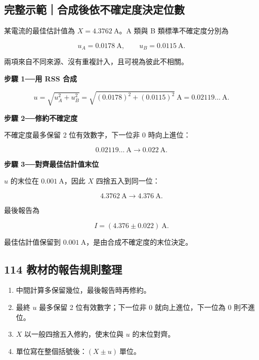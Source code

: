 \documentclass[11pt,a4paper]{article}
\providecommand{\tightlist}{%
  \setlength{\itemsep}{0pt}\setlength{\parskip}{0pt}}
\begin{document}
\begin{HandoutWorkedExample}

\subsection{完整示範｜合成後依不確定度決定位數}\label{ux5b8cux6574ux793aux7bc4ux5408ux6210ux5f8cux4f9dux4e0dux78baux5b9aux5ea6ux6c7aux5b9aux4f4dux6578}

某電流的最佳估計值為 \(X=4.3762\ \mathrm A\)。A 類與 B 類標準不確定度分別為

\[
u_A=0.0178\ \mathrm A,
\qquad
u_B=0.0115\ \mathrm A.
\]

兩項來自不同來源、沒有重複計入，且可視為彼此不相關。

\textbf{步驟 1──用 RSS 合成}

\[
u=\sqrt{u_A^2+u_B^2}
=\sqrt{(0.0178)^2+(0.0115)^2}\ \mathrm A
=0.02119\ldots\ \mathrm A.
\]

\textbf{步驟 2──修約不確定度}

不確定度最多保留 2 位有效數字，下一位非 0 時向上進位：

\[
0.02119\ldots\ \mathrm A\longrightarrow0.022\ \mathrm A.
\]

\textbf{步驟 3──對齊最佳估計值末位}

\(u\) 的末位在 \(0.001\ \mathrm A\)，因此 \(X\) 四捨五入到同一位：

\[
4.3762\ \mathrm A\longrightarrow4.376\ \mathrm A.
\]

最後報告為

\[
\boxed{I=(4.376\pm0.022)\ \mathrm A}.
\]

最佳估計值保留到 \(0.001\ \mathrm A\)，是由合成不確定度的末位決定。

\end{HandoutWorkedExample}

\subsection{114 教材的報告規則整理}\label{ux6559ux6750ux7684ux5831ux544aux898fux5247ux6574ux7406}

\begin{enumerate}
\def\labelenumi{\arabic{enumi}.}
\tightlist
\item
  中間計算多保留幾位，最後報告時再修約。
\item
  最終 \(u\) 最多保留 2 位有效數字；下一位非 0 就向上進位，下一位為 0 則不進位。
\item
  \(X\) 以一般四捨五入修約，使末位與 \(u\) 的末位對齊。
\item
  單位寫在整個括號後：\((X\pm u)\ \text{單位}\)。
\end{enumerate}
\end{document}
